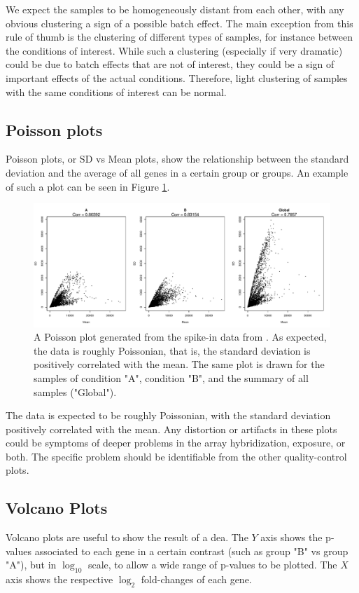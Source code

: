 We expect the samples to be homogeneously distant from each other, with any obvious clustering a sign of a possible batch effect. The main exception from this rule of thumb is the clustering of different types of samples, for instance between the conditions of interest. While such a clustering (especially if very dramatic) could be due to batch effects that are not of interest, they could be a sign of important effects of the actual conditions. Therefore, light clustering of samples with the same conditions of interest can be normal.

\subsection{Poisson plots}
Poisson plots, or SD vs Mean plots, show the relationship between the standard deviation and the average of all genes in a certain group or groups. An example of such a plot can be seen in Figure \ref{fig:poissonplot}.

\begin{figure}
    \centering
    \includegraphics{resources/images/12_SD_vs_Mean Plot.pdf}
    \caption{A Poisson plot generated from the spike-in data from \textcite{zhuPreferredAnalysisMethods2010}. As expected, the data is roughly Poissonian, that is, the standard deviation is positively correlated with the mean. The same plot is drawn for the samples of condition "A", condition "B", and the summary of all samples ("Global").}
    \label{fig:poissonplot}
\end{figure}

The data is expected to be roughly Poissonian, with the standard deviation positively correlated with the mean. Any distortion or artifacts in these plots could be symptoms of deeper problems in the array hybridization, exposure, or both. The specific problem should be identifiable from the other quality-control plots.

\subsection{Volcano Plots}
Volcano plots are useful to show the result of a \gls{dea}. The $Y$ axis shows the p-values associated to each gene in a certain contrast (such as group "B" vs group "A"), but in $\log_{10}$ scale, to allow a wide range of p-values to be plotted. The $X$ axis shows the respective $\log_2$ fold-changes of each gene.

